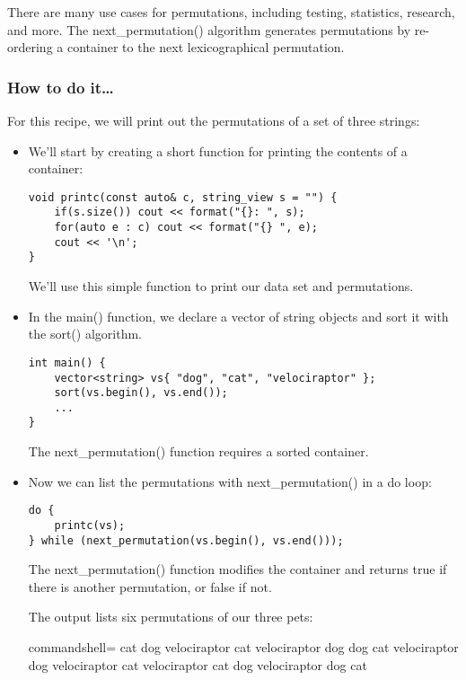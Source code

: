 
There are many use cases for permutations, including testing, statistics, research, and more. The next\_permutation() algorithm generates permutations by re-ordering a container to the next lexicographical permutation.

\subsubsection{How to do it…}

For this recipe, we will print out the permutations of a set of three strings:

\begin{itemize}
\item 
We'll start by creating a short function for printing the contents of a container:

\begin{lstlisting}[style=styleCXX]
void printc(const auto& c, string_view s = "") {
	if(s.size()) cout << format("{}: ", s);
	for(auto e : c) cout << format("{} ", e);
	cout << '\n';
}
\end{lstlisting}

We'll use this simple function to print our data set and permutations.

\item 
In the main() function, we declare a vector of string objects and sort it with the sort() algorithm.

\begin{lstlisting}[style=styleCXX]
int main() {
	vector<string> vs{ "dog", "cat", "velociraptor" };
	sort(vs.begin(), vs.end());
	...
}
\end{lstlisting}

The next\_permutation() function requires a sorted container.

\item 
Now we can list the permutations with next\_permutation() in a do loop:

\begin{lstlisting}[style=styleCXX]
do {
	printc(vs);
} while (next_permutation(vs.begin(), vs.end()));
\end{lstlisting}

The next\_permutation() function modifies the container and returns true if there is another permutation, or false if not.

The output lists six permutations of our three pets:

\begin{tcblisting}{commandshell={}}
cat dog velociraptor
cat velociraptor dog
dog cat velociraptor
dog velociraptor cat
velociraptor cat dog
velociraptor dog cat
\end{tcblisting}
\end{itemize}

